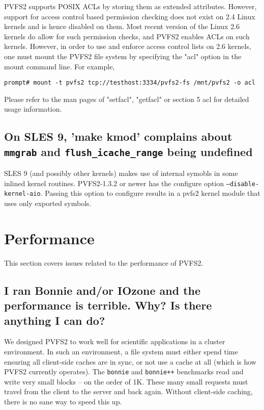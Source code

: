 \documentclass[11pt,letterpaper]{article}
\begin{document}
PVFS2 supports POSIX ACLs by storing them as extended attributes. However, support
for access control based permission checking does not exist on 2.4 Linux kernels and is hence disabled on them.
Most recent version of the Linux 2.6 kernels do allow for such permission checks, and PVFS2 enables
ACLs on such kernels.
However, in order to use and enforce access control lists on 2.6 kernels, one must mount
the PVFS2 file system by specifying the "acl" option in the mount command line. For example,
\begin{verbatim}
prompt# mount -t pvfs2 tcp://testhost:3334/pvfs2-fs /mnt/pvfs2 -o acl
\end{verbatim}
Please refer to the man pages of "setfacl", "getfacl" or section 5 acl for detailed usage
information.

\subsection{On SLES 9, 'make kmod' complains about \texttt{mmgrab} and
 \texttt{flush\_icache\_range} being undefined}

SLES 9 (and possibly other kernels) makes use of internal symobls in some
inlined kernel routines.  PVFS2-1.3.2 or newer has the configure option
\texttt{--disable-kernel-aio}.  Passing this option to configure results in a pvfs2
kernel module that uses only exported symbols.  

%
%
\section{Performance}

This section covers issues related to the performance of PVFS2.

\subsection{I ran Bonnie and/or IOzone and the performance is terrible.
Why? Is there anything I can do?}
\label{sec:badperf}

We designed PVFS2 to work well for scientific applications in a cluster
environment.  In such an environment, a file system must either spend
time ensuring all client-side caches are in sync, or not use a cache
at all (which is how PVFS2 currently operates).  The \texttt{bonnie}
and \texttt{bonnie++} benchmarks read and write very small blocks --
on the order of 1K.  These many small requests must travel from the
client to the server and back again.  Without client-side caching,
there is no sane way to speed this up.
\end{document}
